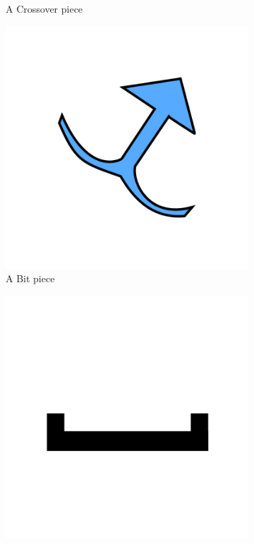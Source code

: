 \documentclass{l4proj}
\begin{document}
\begin{figure}
\begin{subfigure}[b]{0.20\textwidth}
        \caption{A Crossover piece \\}
        \label{fig:crossover}
    \end{subfigure}
    \begin{subfigure}[b]{0.20\textwidth}
        \includegraphics[width=\textwidth]{images/bit.png}
        \caption{A Bit piece \\}
        \label{fig:bit}
    \end{subfigure}
    \begin{subfigure}[b]{0.20\textwidth}
        \includegraphics[width=\textwidth]{images/interceptor.png}

\end{subfigure}
\end{figure}
\end{document}
